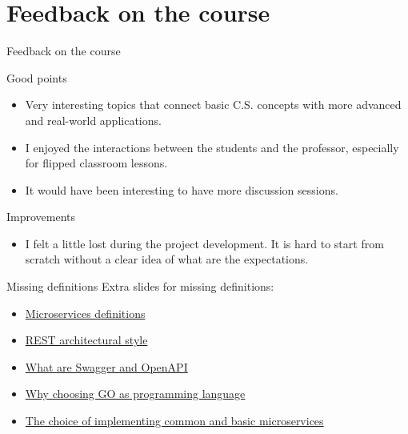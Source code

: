 \documentclass{beamer}
\begin{document}
\section{Feedback on the course}
\begin{frame}{Feedback on the course}
	\begin{block}{Good points}
		\begin{itemize}
			\item Very interesting topics that connect basic C.S. concepts with more advanced and real-world applications.
			\item I enjoyed the interactions between the students and the professor, especially for flipped classroom lessons.
			\item It would have been interesting to have more discussion sessions.
		\end{itemize}
	\end{block}
	\begin{block}{Improvements}
		\begin{itemize}
			\item I felt a little lost during the project development. It is hard to start from scratch without a clear idea of what are the expectations.
		\end{itemize}
	\end{block}
\end{frame}

\begin{frame}{Missing definitions}
	\label{index_1}
	Extra slides for missing definitions:
		\begin{itemize}
			\item \hyperlink{microservices_definitions}{Microservices definitions}
			\item \hyperlink{rest}{REST architectural style}
			\item \hyperlink{swagger_openapi}{What are Swagger and OpenAPI}
			\item \hyperlink{golang}{Why choosing GO as programming language}
			\item \hyperlink{common_ms}{The choice of implementing common and basic microservices}
		\end{itemize}
\end{frame}
\end{document}
